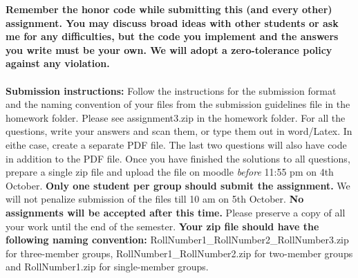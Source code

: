 \documentclass[11pt]{article}
\begin{document}
\maketitle

\textbf{Remember the honor code while submitting this (and every other) assignment. You may discuss broad ideas with other students or ask me for any difficulties, but the code you implement and the answers you write must be your own. We will adopt a \textbf{zero-tolerance policy} against any violation.}
\\
\\
\textbf{Submission instructions:} Follow the instructions for the submission format and the naming convention of your files from the submission guidelines file in the homework folder. Please see \textsf{assignment3.zip} in the homework folder. For all the questions, write your answers and scan them, or type them out in word/Latex. In eithe case, create a separate PDF file. The last two questions will also have code in addition to the PDF file. Once you have finished the solutions to all questions, prepare a single zip file and upload the file on moodle \emph{before} 11:55 pm on 4th October.  \textbf{Only one student per group should submit the assignment.} We will not penalize submission of the files till 10 am on 5th October. \textbf{No assignments will be accepted after this time.} Please preserve a copy of all your work until the end of the semester.  \textbf{Your zip file should have the following naming convention:} RollNumber1\_RollNumber2\_RollNumber3.zip for three-member groups, RollNumber1\_RollNumber2.zip for two-member groups and RollNumber1.zip for single-member groups. 
\end{document}

